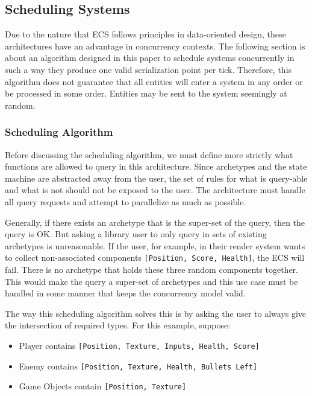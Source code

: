 \subsection{Scheduling Systems}
\label{sec:scheduling}

Due to the nature that ECS follows principles in data-oriented design, these architectures have an advantage in concurrency contexts. The following section is about an algorithm designed in this paper to schedule systems concurrently in such a way they produce one valid serialization point per tick. Therefore, this algorithm does not guarantee that all entities will enter a system in any order or be processed in some order. Entities may be sent to the system seemingly at random.

\subsubsection{Scheduling Algorithm}
Before discussing the scheduling algorithm, we must define more strictly what functions are allowed to query in this architecture. Since archetypes and the state machine are abstracted away from the user, the set of rules for what is query-able and what is not should not be exposed to the user. The architecture must handle all query requests and attempt to parallelize as much as possible. 

Generally, if there exists an archetype that is the super-set of the query, then the query is OK. But asking a library user to only query in sets of existing archetypes is unreasonable. If the user, for example, in their render system wants to collect non-associated components \texttt{[Position, Score, Health]}, the ECS will fail. There is no archetype that holds these three random components together. This would make the query a super-set of archetypes and this use case must be handled in some manner that keeps the concurrency model valid. 

The way this scheduling algorithm solves this is by asking the user to always give the intersection of required types. For this example, suppose:
\begin{itemize}
    \item Player contains \texttt{[Position, Texture, Inputs, Health, Score]}
    \item Enemy contains \texttt{[Position, Texture, Health, Bullets Left]}
    \item Game Objects contain \texttt{[Position, Texture]}
\end{itemize}

